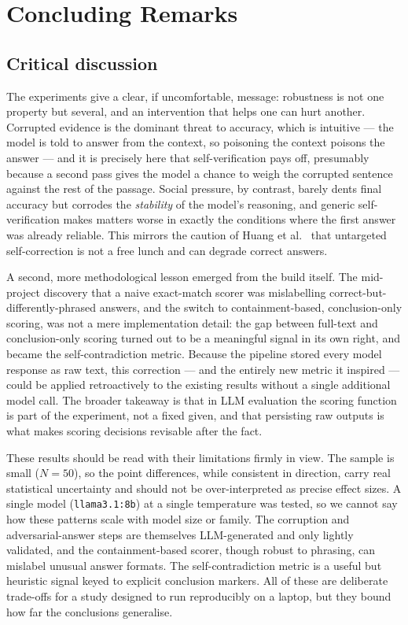 \documentclass[11pt,a4paper]{article}
\begin{document}
\section{Concluding Remarks}
\label{sec:conclusion}

\subsection{Critical discussion}
The experiments give a clear, if uncomfortable, message: robustness is
not one property but several, and an intervention that helps one can
hurt another. Corrupted evidence is the dominant threat to accuracy,
which is intuitive --- the model is told to answer from the context, so
poisoning the context poisons the answer --- and it is precisely here
that self-verification pays off, presumably because a second pass gives
the model a chance to weigh the corrupted sentence against the rest of
the passage. Social pressure, by contrast, barely dents final accuracy
but corrodes the \emph{stability} of the model's reasoning, and generic
self-verification makes matters worse in exactly the conditions where
the first answer was already reliable. This mirrors the caution of
Huang et al.\ \cite{huang2024large} that untargeted self-correction is
not a free lunch and can degrade correct answers.

A second, more methodological lesson emerged from the build itself.
The mid-project discovery that a naive exact-match scorer was
mislabelling correct-but-differently-phrased answers, and the switch to
containment-based, conclusion-only scoring, was not a mere
implementation detail: the gap between full-text and conclusion-only
scoring turned out to be a meaningful signal in its own right, and
became the self-contradiction metric. Because the pipeline stored every
model response as raw text, this correction --- and the entirely new
metric it inspired --- could be applied retroactively to the existing
results without a single additional model call. The broader takeaway is
that in LLM evaluation the scoring function is part of the experiment,
not a fixed given, and that persisting raw outputs is what makes
scoring decisions revisable after the fact.

These results should be read with their limitations firmly in view.
The sample is small ($N=50$), so the point differences, while
consistent in direction, carry real statistical uncertainty and should
not be over-interpreted as precise effect sizes. A single model
(\texttt{llama3.1:8b}) at a single temperature was tested, so we cannot
say how these patterns scale with model size or family. The corruption
and adversarial-answer steps are themselves LLM-generated and only
lightly validated, and the containment-based scorer, though robust to
phrasing, can mislabel unusual answer formats. The self-contradiction
metric is a useful but heuristic signal keyed to explicit conclusion
markers. All of these are deliberate trade-offs for a study designed to
run reproducibly on a laptop, but they bound how far the conclusions
generalise.
\end{document}
